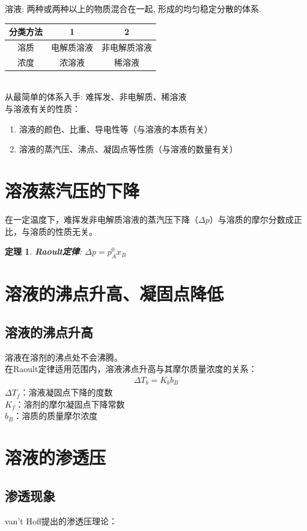 \documentclass[12pt, a4paper, oneside]{ctexbook}
\newtheorem{theorem}{定理}[section]
\begin{document}
溶液: 两种或两种以上的物质混合在一起, 形成的均匀稳定分散的体系. 
\begin{table}[htbp]
    \centering
    \begin{tabular}{|c|c|c|}
        \hline
        分类方法 & 1 & 2\\
        \hline
        溶质 & 电解质溶液 & 非电解质溶液\\
        \hline
        浓度 & 浓溶液 & 稀溶液\\
        \hline
    \end{tabular}
\end{table}
\\从最简单的体系入手: 难挥发、非电解质、稀溶液
\\与溶液有关的性质：
\begin{enumerate}
    \item 溶液的颜色、比重、导电性等（与溶液的本质有关）
    \item 溶液的蒸汽压、沸点、凝固点等性质（与溶液的数量有关）
\end{enumerate}

\section{溶液蒸汽压的下降}
在一定温度下，难挥发非电解质溶液的蒸汽压下降（$\Delta p$）与溶质的摩尔分数成正比，与溶质的性质无关。
\begin{theorem}
    \textbf{Raoult定律}: $\Delta p = p_A^0 x_B$
\end{theorem}

\section{溶液的沸点升高、凝固点降低}
\subsection{溶液的沸点升高}
溶液在溶剂的沸点处不会沸腾。\\
在Raoult定律适用范围内，溶液沸点升高与其摩尔质量浓度的关系：
\begin{align*}
    \Delta T_b = K_b b_B
\end{align*}
$\Delta T_f$：溶液凝固点下降的度数\\
$K_f$：溶剂的摩尔凝固点下降常数\\
$b_B$：溶质的质量摩尔浓度\\

\section{溶液的渗透压}
\subsection{渗透现象}
van't Hoff提出的渗透压理论：
\end{document}
